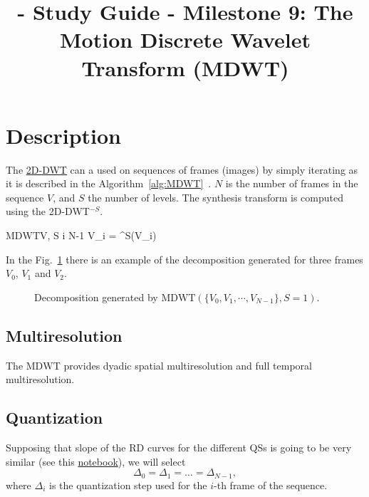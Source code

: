 
\title{\SM{} - Study Guide - Milestone 9: The Motion Discrete Wavelet Transform (MDWT)}

\maketitle

\tableofcontents

\section{Description}

The
\href{https://sistemas-multimedia.github.io/milestones/06-2D-DWT/}{2D-DWT}
can a used on sequences of frames (images) by simply iterating as it
is described in the
Algorithm~\ref{alg:MDWT}~\cite{taubman2002jpeg2000}. $N$ is the number
of frames in the sequence $V$, and $S$ the number of levels. The
synthesis transform is computed using the 2D-DWT$^{-S}$.

\begin{pseudocode}{$\text{MDWT}$}{V, S}
  \label{alg:MDWT}
  \FOR i  \TO N-1 \DO
  V_i = ^S(V_i)
\end{pseudocode}

In the Fig.~\ref{fig:MDWT} there is an example of the decomposition
generated for three frames $V_0$, $V_1$ and $V_2$.

\begin{figure}
  \centering
  \caption{Decomposition generated by $\text{MDWT}(\{V_0, V_1, \cdots, V_{N-1}\}, S=1)$.}
  \label{fig:MDWT}
\end{figure}

\subsection{Multiresolution}
The $\text{MDWT}$ provides dyadic spatial multiresolution and full
temporal multiresolution.

\subsection{Quantization}
Supposing that slope of the RD curves for the different QSs is going
to be very similar (see this
\href{https://github.com/Sistemas-Multimedia/Sistemas-Multimedia.github.io/blob/master/milestones/09-MDWT/performance.ipynb}{notebook}),
we will select
\begin{equation}
  \Delta_0=\Delta_1=\dots=\Delta_{N-1},
\end{equation}
where $\Delta_i$ is the quantization step used for the $i$-th frame of
the sequence.

